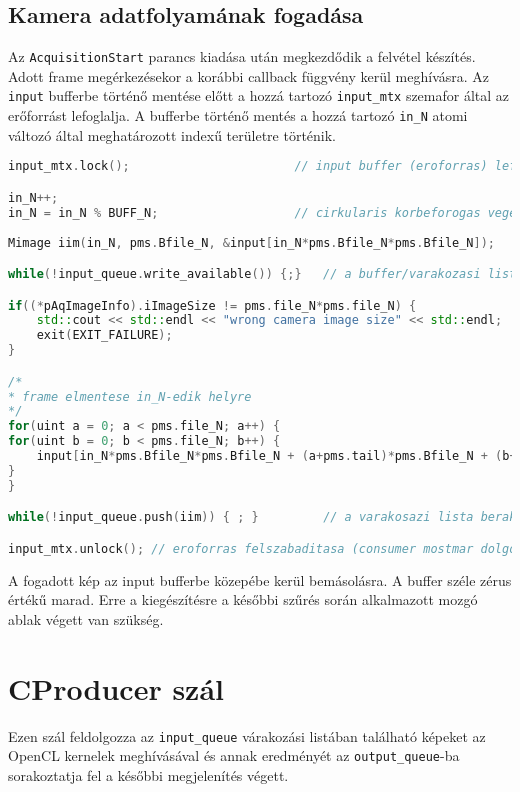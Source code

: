 	\subsection*{Kamera adatfolyamának fogadása}
	Az \texttt{AcquisitionStart} parancs kiadása után megkezdődik a felvétel készítés. Adott frame megérkezésekor a korábbi callback
	függvény kerül meghívásra. Az \texttt{input} bufferbe történő mentése előtt a hozzá tartozó \texttt{input\_mtx}
	szemafor által az erőforrást lefoglalja. A bufferbe történő mentés a hozzá tartozó \texttt{in\_N} atomi változó által
	meghatározott indexű területre történik.
	
\begin{lstlisting}[language=C++]
input_mtx.lock();						// input buffer (eroforras) lefoglalasa

in_N++;
in_N = in_N % BUFF_N;					// cirkularis korbeforogas vegett
 
Mimage iim(in_N, pms.Bfile_N, &input[in_N*pms.Bfile_N*pms.Bfile_N]);

while(!input_queue.write_available()) {;}	// a buffer/varakozasi lista kiurulesere varas

if((*pAqImageInfo).iImageSize != pms.file_N*pms.file_N) {
	std::cout << std::endl << "wrong camera image size" << std::endl;
	exit(EXIT_FAILURE);
}

/*
* frame elmentese in_N-edik helyre
*/
for(uint a = 0; a < pms.file_N; a++) {
for(uint b = 0; b < pms.file_N; b++) {
	input[in_N*pms.Bfile_N*pms.Bfile_N + (a+pms.tail)*pms.Bfile_N + (b+pms.tail)] = (*pAqImageInfo).pImageBuffer[a*pms.file_N + b];
}
}

while(!input_queue.push(iim)) { ; }			// a varakosazi lista berakas

input_mtx.unlock(); // eroforras felszabaditasa (consumer mostmar dolgozhat rajta)
\end{lstlisting}
	
	A fogadott kép az input bufferbe közepébe kerül bemásolásra. A buffer széle zérus értékű marad. Erre a kiegészítésre a későbbi
	szűrés során alkalmazott mozgó ablak végett van szükség.
	
\section{CProducer szál}
Ezen szál feldolgozza az \texttt{input\_queue} várakozási listában található képeket az OpenCL kernelek meghívásával és annak
eredményét az \texttt{output\_queue}-ba sorakoztatja fel a későbbi megjelenítés végett.
	
